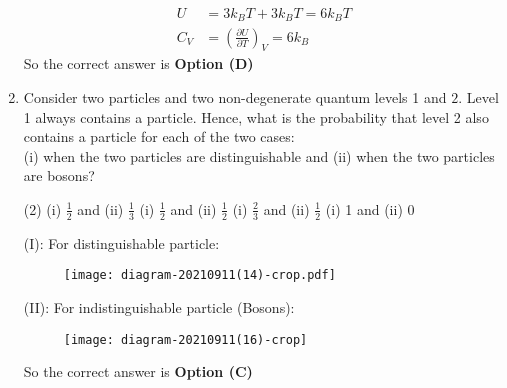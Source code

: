 \begin{enumerate}
\begin{answer}
\begin{align*}
U&=3 k_{B} T+3 k_{B} T=6 k_{B} T\\
C_{V}&=\left(\frac{\partial U}{\partial T}\right)_{V}=6 k_{B}
\end{align*}
So the correct answer is \textbf{Option (D)}
\end{answer}
	\item Consider two particles and two non-degenerate quantum levels 1 and $2 .$ Level 1 always contains a particle. Hence, what is the probability that level 2 also contains a particle for each of the two cases:\\
(i) when the two particles are distinguishable and (ii) when the two particles are bosons?
{}
\begin{tasks}(2)
\task[\textbf{A.}] (i) $\frac{1}{2}$ and (ii) $\frac{1}{3}$
\task[\textbf{B.}] (i) $\frac{1}{2}$ and (ii) $\frac{1}{2}$
\task[\textbf{C.}] (i) $\frac{2}{3}$ and (ii) $\frac{1}{2}$
\task[\textbf{D.}] (i) 1 and (ii) 0
\end{tasks}
\begin{answer}
(I): For distinguishable particle:\\\begin{figure}[H]
	\centering
	\texttt{[image: diagram-20210911(14)-crop.pdf]}
\end{figure}
(II): For indistinguishable particle (Bosons):\\
\begin{figure}[H]
	\centering
	\texttt{[image: diagram-20210911(16)-crop]}
\end{figure}
So the correct answer is \textbf{Option (C)}
\end{answer}
\end{enumerate}

